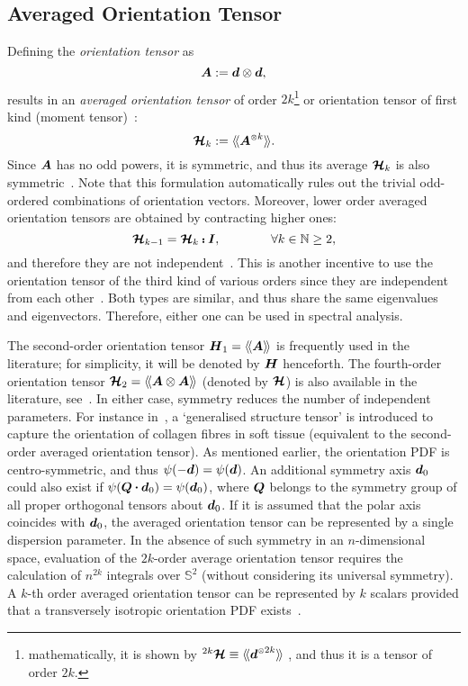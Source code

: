 \subsection{Averaged Orientation Tensor}
	Defining the \textit{orientation tensor} as
	\begin{equation}
		\tenb{A}\equidef \tena{d}\dyad\tena{d},\label{eq:ot}
	\end{equation}
	results in an \textit{averaged orientation tensor} of order $2k$\footnote{mathematically, it is shown by $\tenn{H}{2k}\equiv\averot{\tena{d}^\tenpow{2k}}$ , and thus it is a tensor of order $2k$.} or orientation tensor of first kind (moment tensor)~\autocite{Kanatani.1984}:
	\begin{equation}
		\ten{H}_k\equidef \averot{\tenb{A}^\tenpow{k}}.\label{eq:ot1}
	\end{equation}
	Since $\tenb{A}$ has no odd powers, it is symmetric, and thus its average $\mathord{\mbox{\boldmath$\mathcal{H}$}}_k$ is also symmetric~\autocite{Kanatani.1984,Comon.2008}. Note that this formulation automatically rules out the trivial odd-ordered combinations of orientation vectors. Moreover, lower order averaged orientation tensors are obtained by contracting higher ones: 
	\begin{equation}
	\ten{H}_{k-1} = \ten{H}_{k}\dscp\unitb,\qquad\qquad \forall k\in\Natural\ge2,
	\end{equation}
	and therefore they are not independent~\autocite{Advani.1987}. This is another incentive to use the orientation tensor of the third kind of various orders since they are independent from each other~\autocite{Kanatani.1984}. Both types are similar, and thus share the same eigenvalues and eigenvectors. Therefore, either one can be used in spectral analysis.
	
	The second-order orientation tensor $\tenb{H}_{1}=\averot{\tenb{A}}$ is frequently used in the literature; for simplicity, it will be denoted by $\tenb{H}$ henceforth. The fourth-order orientation tensor $\tend{H}_{2}=\averot{\tenb{A}\dyad\tenb{A}}$ (denoted by $\mathord{\mbox{\boldmath$\mathcal{H}$}}$) is also available in the literature, see~\autocite{Vasta.2014}. In either case, symmetry reduces the number of independent parameters. For instance in~\autocite{Gasser.2006}, a `generalised structure tensor' is introduced to capture the orientation of collagen fibres in soft tissue (equivalent to the second-order averaged orientation tensor). As mentioned earlier, the orientation PDF is centro-symmetric, and thus $\psi(-\tena{d})=\psi(\tena{d})$. An additional symmetry axis $\tena{d}_0$ could also exist if $\psi(\tenb{Q}\scp\tena{d}_0)=\psi(\tena{d}_0)$, where $\tenb{Q}$ belongs to the symmetry group of all proper orthogonal tensors about $\tena{d}_0$. If it is assumed that the polar axis coincides with $\tena{d}_0$, the averaged orientation tensor can be represented by a single dispersion parameter. In the absence of such symmetry in an $n$-dimensional space, evaluation of the $2k$-order average orientation tensor requires the calculation of $n^{2k}$ integrals over $\mathbb{S}^2$ (without considering its universal symmetry). A $k$-th order averaged orientation tensor can be represented by $k$ scalars provided that a transversely isotropic orientation PDF exists~\autocite{Hashlamoun.2017}.
	 
